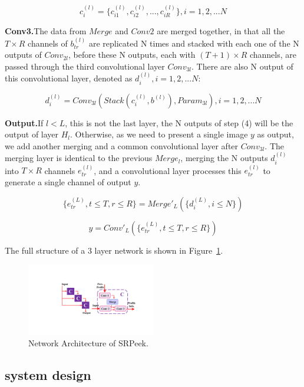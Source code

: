 $$ c_i^{(l)} = \{c_{i1}^{(l)},c_{i2}^{(l)},...,c_{iR}^{(l)}\}, i=1,2,...N$$

\vspace{1mm}
\noindent
\textbf{Conv3.}The data from $Merge$ and $Conv2$ are merged together, in that all the $T\times R$ channels of $b_{tr}^{(l)}$ are replicated N times and stacked with each one of the N outputs of $Conv_{2l}$, before these N outputs, each with $(T+1)\times R$ channels, are passed through the third convolutional layer $Conv_{3l}$. There are also N output of this convolutional layer, denoted as $d_i^{(l)}, i=1,2,...N$:

$$ d_i^{(l)} = Conv_{3l}(Stack(c_i^{(l)},b^{(l)}),Param_{3l}), i=1,2,...N $$

\vspace{1mm}
\noindent
\textbf{Output.}If $l < L$, this is not the last layer, the N outputs of step (4) will be the output of layer $H_l$. Otherwise, as we need to present a single image $y$ as output, we add another merging and a common convolutional layer after $Conv_{3l}$. The merging layer is identical to the previous $Merge_l$, merging the N outputs $d_i^{(l)}$ into $T\times R$ channels $e_{tr}^{(l)}$, and a convolutional layer processes this $e_{tr}^{(l)}$ to generate a single channel of output $y$. 


$$ \{e_{tr}^{(L)},t\le T,r\le R\} = Merge'_{L}(\{d_i^{(L)},i\le N\})$$


$$ y = Conv'_{L}(\{e_{tr}^{(L)},t\le T,r\le R\} )$$



The full structure of a 3 layer network is shown in Figure~\ref{fig-system}.

\begin{figure}
 \centering
    \includegraphics[width=0.5\textwidth]{./pic/network.pdf}
    \caption{Network Architecture of SRPeek.}
    \label{fig-system}
\end{figure}

\subsection{system design}



